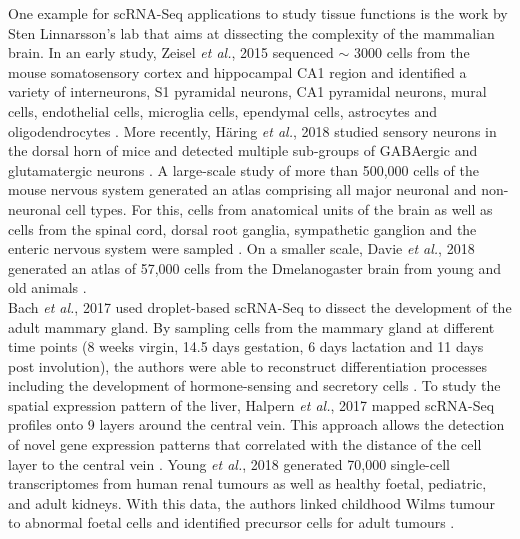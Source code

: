 One example for scRNA-Seq applications to study tissue functions is the work by Sten Linnarsson's lab that aims at dissecting the complexity of the mammalian brain. 
In an early study, Zeisel \emph{et al.}, 2015 sequenced $\sim$ 3000 cells from the mouse somatosensory cortex and hippocampal \gls{CA}1 region and identified a variety of interneurons, S1 pyramidal neurons, CA1 pyramidal neurons, mural cells, endothelial cells, microglia cells, ependymal cells, astrocytes and oligodendrocytes \citep{Zeisel2015}. 
More recently, H\"a{}ring \emph{et al.}, 2018 studied sensory neurons in the dorsal horn of mice and detected multiple sub-groups of \gls{GABA}ergic and glutamatergic neurons \citep{Haring2018}. 
A large-scale study of more than 500,000 cells of the mouse nervous system generated an atlas comprising all major neuronal and non-neuronal cell types. For this, cells from anatomical units of the brain as well as cells from the spinal cord, dorsal root ganglia, sympathetic ganglion and the enteric nervous system were sampled \citep{Zeisel2018}. 
On a smaller scale, Davie \emph{et al.}, 2018 generated an atlas of 57,000 cells from the \gls{Dmelanogaster} brain from young and old animals \cite{Davie2018}.\\

Bach \emph{et al.}, 2017 used droplet-based scRNA-Seq to dissect the development of the adult mammary gland. 
By sampling cells from the mammary gland at different time points (8 weeks virgin, 14.5 days gestation, 6 days lactation and 11 days post involution), the authors were able to reconstruct differentiation processes including the development of hormone-sensing and secretory cells \citep{Bach2017}. 
To study the spatial expression pattern of the liver, Halpern \emph{et al.}, 2017 mapped scRNA-Seq profiles onto 9 layers around the central vein. 
This approach allows the detection of novel gene expression patterns that correlated with the distance of the cell layer to the central vein \citep{Halpern2017}. 
Young \emph{et al.}, 2018 generated 70,000 single-cell transcriptomes from human renal tumours as well as healthy foetal, pediatric, and adult kidneys. 
With this data, the authors linked childhood Wilms tumour to abnormal foetal cells and identified precursor cells for adult tumours \citep{Young2018}. \\

